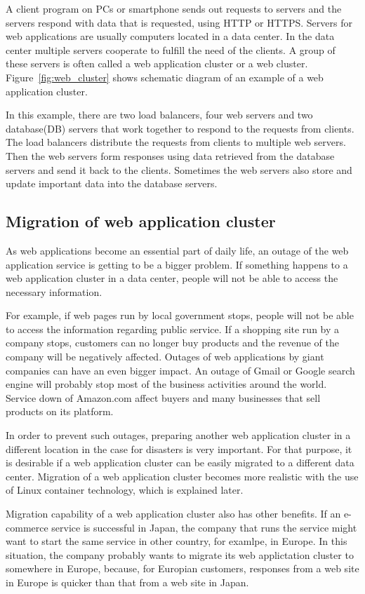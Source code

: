 A client program on PCs or smartphone sends out requests to servers and the servers respond with data that is requested, using HTTP or HTTPS. 
Servers for web applications are usually computers located in a data center.
In the data center multiple servers cooperate to fulfill the need of the clients.
A group of these servers is often called a web application cluster or a web cluster.
Figure~\ref{fig:web_cluster} shows schematic diagram of an example of a web application cluster.

In this example, there are two load balancers, four web servers and two database(DB) servers that work together to respond to the requests from clients.
The load balancers distribute the requests from clients to multiple web servers.
Then the web servers form responses using data retrieved from the database servers and send it back to the clients.
Sometimes the web servers also store and update important data into the database servers.

\subsection{Migration of web application cluster}

As web applications become an essential part of daily life, an outage of the web application service is getting to be a bigger problem.
If something happens to a web application cluster in a data center, people will not be able to access the necessary information.

For example, if web pages run by local government stops, people will not be able to access the information regarding public service.
If a shopping site run by a company stops, customers can no longer buy products and the revenue of the company will be negatively affected.
Outages of web applications by giant companies can have an even bigger impact.
An outage of Gmail or Google search engine will probably stop most of the business activities around the world.
Service down of Amazon.com affect buyers and many businesses that sell products on its platform.

In order to prevent such outages, preparing another web application cluster in a different location in the case for disasters is very important.
For that purpose, it is desirable if a web application cluster can be easily migrated to a different data center.
Migration of a web application cluster becomes more realistic with the use of Linux container technology, which is explained later.

Migration capability of a web application cluster also has other benefits.
If an e-commerce service is successful in Japan, the company that runs the service might want to start the same service in other country, for examlpe, in Europe.
In this situation, the company probably wants to migrate its web applictation cluster to somewhere in Europe, because, for Europian customers, responses from a web site in Europe is quicker than that from a web site in Japan.

